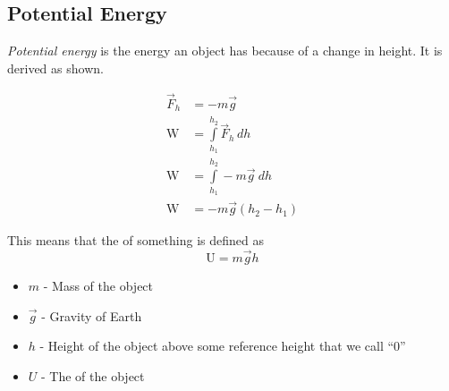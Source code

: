\subsection{Potential Energy} \label{subsec:Potential Energy}
\begin{definition} \label{def:Potential Energy}
  \emph{Potential energy} is the energy an object has because of a change in height.
  It is derived as shown.

  \begin{align*}
    \vec{F}_{h} &= -m \vec{g} \\
    \text{W} &= \int\limits_{h_{1}}^{h_{2}} \vec{F}_{h} \, dh \\
    \text{W} &= \int\limits_{h_{1}}^{h_{2}} -m \vec{g} \: dh \\
    \text{W} &= -m \vec{g} \left( h_{2}-h_{1} \right)
  \end{align*}

  This means that the  of something is defined as
  \begin{equation} \label{eq:Potential Energy}
    \text{U} = m \vec{g} h
  \end{equation}
  \begin{itemize}[noitemsep, nolistsep]
    \item $m$ - Mass of the object
    \item $\vec{g}$ - Gravity of Earth
    \item $h$ - Height of the object above some reference height that we call ``0''
    \item $U$ - The  of the object
  \end{itemize}
\end{definition}  

